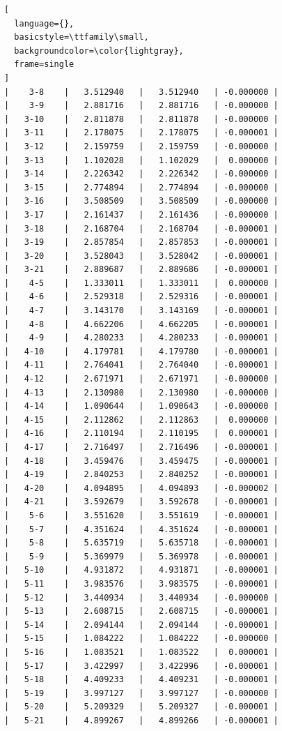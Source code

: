 \documentclass{article}
\begin{document}
\begin{lstlisting}[
  language={},
  basicstyle=\ttfamily\small,
  backgroundcolor=\color{lightgray},
  frame=single
]
|    3-8    |   3.512940   |   3.512940   | -0.000000 |
|    3-9    |   2.881716   |   2.881716   | -0.000000 |
|   3-10    |   2.811878   |   2.811878   | -0.000000 |
|   3-11    |   2.178075   |   2.178075   | -0.000001 |
|   3-12    |   2.159759   |   2.159759   | -0.000000 |
|   3-13    |   1.102028   |   1.102029   |  0.000000 |
|   3-14    |   2.226342   |   2.226342   | -0.000000 |
|   3-15    |   2.774894   |   2.774894   | -0.000000 |
|   3-16    |   3.508509   |   3.508509   | -0.000000 |
|   3-17    |   2.161437   |   2.161436   | -0.000000 |
|   3-18    |   2.168704   |   2.168704   | -0.000001 |
|   3-19    |   2.857854   |   2.857853   | -0.000001 |
|   3-20    |   3.528043   |   3.528042   | -0.000001 |
|   3-21    |   2.889687   |   2.889686   | -0.000001 |
|    4-5    |   1.333011   |   1.333011   |  0.000000 |
|    4-6    |   2.529318   |   2.529316   | -0.000001 |
|    4-7    |   3.143170   |   3.143169   | -0.000001 |
|    4-8    |   4.662206   |   4.662205   | -0.000001 |
|    4-9    |   4.280233   |   4.280233   | -0.000001 |
|   4-10    |   4.179781   |   4.179780   | -0.000001 |
|   4-11    |   2.764041   |   2.764040   | -0.000001 |
|   4-12    |   2.671971   |   2.671971   | -0.000000 |
|   4-13    |   2.130980   |   2.130980   | -0.000000 |
|   4-14    |   1.090644   |   1.090643   | -0.000000 |
|   4-15    |   2.112862   |   2.112863   |  0.000000 |
|   4-16    |   2.110194   |   2.110195   |  0.000001 |
|   4-17    |   2.716497   |   2.716496   | -0.000001 |
|   4-18    |   3.459476   |   3.459475   | -0.000001 |
|   4-19    |   2.840253   |   2.840252   | -0.000001 |
|   4-20    |   4.094895   |   4.094893   | -0.000002 |
|   4-21    |   3.592679   |   3.592678   | -0.000001 |
|    5-6    |   3.551620   |   3.551619   | -0.000001 |
|    5-7    |   4.351624   |   4.351624   | -0.000001 |
|    5-8    |   5.635719   |   5.635718   | -0.000001 |
|    5-9    |   5.369979   |   5.369978   | -0.000001 |
|   5-10    |   4.931872   |   4.931871   | -0.000001 |
|   5-11    |   3.983576   |   3.983575   | -0.000001 |
|   5-12    |   3.440934   |   3.440934   | -0.000000 |
|   5-13    |   2.608715   |   2.608715   | -0.000001 |
|   5-14    |   2.094144   |   2.094144   | -0.000001 |
|   5-15    |   1.084222   |   1.084222   | -0.000000 |
|   5-16    |   1.083521   |   1.083522   |  0.000001 |
|   5-17    |   3.422997   |   3.422996   | -0.000001 |
|   5-18    |   4.409233   |   4.409231   | -0.000001 |
|   5-19    |   3.997127   |   3.997127   | -0.000000 |
|   5-20    |   5.209329   |   5.209327   | -0.000001 |
|   5-21    |   4.899267   |   4.899266   | -0.000001 |

\end{lstlisting}
\end{document}
